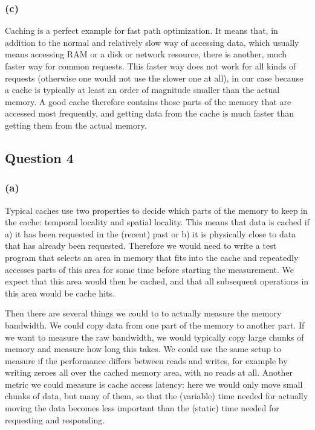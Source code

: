 \documentclass[12pt,a4paper]{article}
\begin{document}
\subsubsection*{(c)}
Caching is a perfect example for fast path optimization. It means that, in addition to the normal and relatively slow way of accessing data, which usually means accessing RAM or a disk or network resource, there is another, much faster way for common requests. This faster way does not work for all kinds of requests (otherwise one would not use the slower one at all), in our case because a cache is typically at least an order of magnitude smaller than the actual memory. A good cache therefore contains those parts of the memory that are accessed most frequently, and getting data from the cache is much faster than getting them from the actual memory. 

\subsection*{Question 4}
\label{sec:eq4}

\subsubsection*{(a)}
Typical caches use two properties to decide which parts of the memory to keep in the cache: temporal locality and spatial locality. This means that data is cached if a) it has been requested in the (recent) past or b) it is physically close to data that has already been requested. Therefore we would need to write a test program that selects an area in memory that fits into the cache and repeatedly accesses parts of this area for some time before starting the measurement. We expect that this area would then be cached, and that all subsequent operations in this area would be cache hits.

Then there are several things we could to to actually measure the memory bandwidth. We could copy data from one part of the memory to another part. If we want to measure the raw bandwidth, we would typically copy large chunks of memory and measure how long this takes. We could use the same setup to measure if the performance differs between reads and writes, for example by writing zeroes all over the cached memory area, with no reads at all. Another metric we could measure is cache access latency: here we would only move small chunks of data, but many of them, so that the (variable) time needed for actually moving the data becomes less important than the (static) time needed for requesting and responding.
\end{document}
